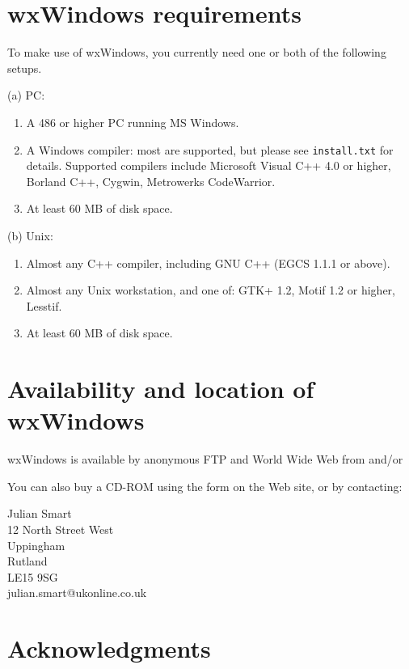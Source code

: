 \section{wxWindows requirements}\label{requirements}

To make use of wxWindows, you currently need one or both of the
following setups.

(a) PC:

\begin{enumerate}\itemsep=0pt
\item A 486 or higher PC running MS Windows.
\item A Windows compiler: most are supported, but please see {\tt install.txt} for
details. Supported compilers include Microsoft Visual C++ 4.0 or higher, Borland C++, Cygwin,
Metrowerks CodeWarrior.
\item At least 60 MB of disk space.
\end{enumerate}

(b) Unix:

\begin{enumerate}\itemsep=0pt
\item Almost any C++ compiler, including GNU C++ (EGCS 1.1.1 or above).
\item Almost any Unix workstation, and one of: GTK+ 1.2, Motif 1.2 or higher, Lesstif.
\item At least 60 MB of disk space.
\end{enumerate}

\section{Availability and location of wxWindows}

wxWindows is available by anonymous FTP and World Wide Web
from  
and/or 

You can also buy a CD-ROM using the form on the Web site, or by contacting:

Julian Smart\\
12 North Street West\\
Uppingham\\
Rutland\\
LE15 9SG\\
julian.smart@ukonline.co.uk

\section{Acknowledgments}

